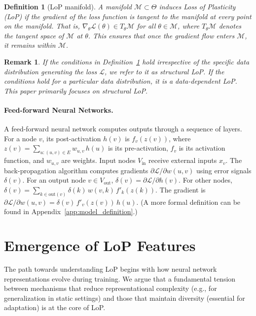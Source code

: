 \documentclass{article}
\newcommand{\Loss}{\mathcal{L}}
\newtheorem{definition}{Definition}[section]
\newtheorem{remark}{Remark}[section]
\begin{document}
\begin{definition}[LoP manifold]
\label{def:lop_manifold_main}
A manifold $\mathcal{M}\subset\Theta$ induces Loss of Plasticity (LoP) if the gradient of the loss function is tangent to the manifold at every point on the manifold. That is, $\nabla_\theta\Loss(\theta)\in T_\theta\mathcal{M}$ for all $\theta\in\mathcal{M}$, where $T_\theta\mathcal{M}$ denotes the tangent space of $\mathcal{M}$ at $\theta$. This ensures that once the gradient flow enters $\mathcal{M}$, it remains within $\mathcal{M}$.
\end{definition}

\begin{remark}
If the conditions in Definition~\ref{def:lop_manifold_main} hold irrespective of the specific data distribution generating the loss $\Loss$, we refer to it as structural LoP. If the conditions hold for a particular data distribution, it is a data-dependent LoP. This paper primarily focuses on structural LoP.
\end{remark}

\paragraph{Feed-forward Neural Networks.}
A feed-forward neural network computes outputs through a sequence of layers. For a node $v$, its post-activation $h(v)$ is $f_v (z(v))$, where $z(v) = \sum_{u: (u,v)\in E}w_{u,v}\,h(u)$ is its pre-activation, $f_v$ is its activation function, and $w_{u,v}$ are weights. Input nodes $V_{\text{in}}$ receive external inputs $x_v$.
The back-propagation algorithm computes gradients $\partial\Loss/\partial w(u,v)$ using error signals $\delta(v)$. For an output node $v \in V_{\text{out}}$, $\delta(v)=\partial\Loss/\partial h(v)$. For other nodes, $\delta(v)=\sum_{k\in\mathrm{out}(v)}\delta(k)\,w(v,k)\,f'_k(z(k))$. The gradient is $\partial\Loss/\partial w(u,v)=\delta(v)\,f'_v(z(v))\,h(u)$.
(A more formal definition can be found in Appendix~\ref{app:model_definition}.)

\section{Emergence of LoP Features}
\label{sec:emergence_lop}

The path towards understanding LoP begins with how neural network representations evolve during training. We argue that a fundamental tension between mechanisms that reduce representational complexity (e.g., for generalization in static settings) and those that maintain diversity (essential for adaptation) is at the core of LoP.
\end{document}
